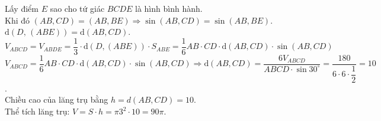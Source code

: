 \begin{ex}
{		Lấy điểm $E$ sao cho tứ giác $BCDE$ là hình bình hành.\\
		Khi đó $\left(AB,CD\right)=\left(AB,BE\right)\Rightarrow\sin\left(AB,CD\right)=\sin\left(AB,BE\right)$.\\
		$\text{d}\left(D,\,\left(ABE\right)\right)=\text{d}\left(AB,CD\right)$.\\
		$V_{ABCD}=V_{ABDE}=\dfrac{1}{3}\cdot\text{d}\left(D,\left(ABE\right)\right)\cdot S_{ABE}=\dfrac{1}{6}AB\cdot CD\cdot\text{d}\left(AB,CD\right)\cdot\sin\left(AB,CD\right)$\\
		$V_{ABCD}=\dfrac{1}{6}AB\cdot CD\cdot\text{d}\left(AB,CD\right)\cdot\sin\left(AB,CD\right)\Rightarrow \text{d}\left(AB,CD\right)=\dfrac{6V_{ABCD}}{ABCD\cdot\sin 30^\circ}=\dfrac{180}{6\cdot6\cdot\dfrac{1}{2}}=10$.\\
		Chiều cao của lăng trụ bằng $h=d\left(AB,CD\right)=10$.\\
		Thể tích lăng trụ: $V=S\cdot h=\pi{3^2}\cdot10=90\pi$.}
\end{ex}
